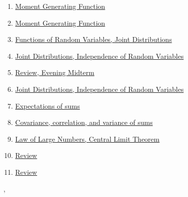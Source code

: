 \documentclass[11pt]{article}
\renewcommand{\today}{\shortmonthname[\the\month] \the \day,  \the\year}
\begin{document}
\begin{enumerate}
	\item \href{https://mp.weixin.qq.com/s/lP6WmQxTuOAwIVWX2l-R7w}{Moment Generating Function}	%
	\item \href{https://mp.weixin.qq.com/s/w0xw15BrqY0AKYgW2ufKmw}{Moment Generating Function}	%
	\item \href{https://mp.weixin.qq.com/s/Du8kpT0ZJNqTmF19jB77Tw}{Functions of Random Variables, Joint Distributions}	%
	\item \href{https://mp.weixin.qq.com/s/xD0om1IdLj2fYWv1Va8x_g}{Joint Distributions, Independence of Random Variables}	%
	\item \href{https://mp.weixin.qq.com/s/WeCfY_6vsuOCYoa5fzg6pA}{Review, Evening Midterm}	%
	\item \href{https://mp.weixin.qq.com/s/puiGaF7O1M4J7Uo1hb97Nw}{Joint Distributions, Independence of Random Variables}	%
	\item \href{https://mp.weixin.qq.com/s/fEFx-A-fnqv8xho8BOdB5w}{Expectations of sums}	%
	\item \href{https://mp.weixin.qq.com/s/ikPEHT3tXY-da3wx5OJwFA}{Covariance, correlation, and variance of sums}	%
	\item \href{https://mp.weixin.qq.com/s/YKNfrUm2wMZBPx_1pOuOUQ}{Law of Large Numbers, Central Limit Theorem}	%
	\item \href{https://mp.weixin.qq.com/s/aHcqkczkwNbvHpGR82rQJA}{Review}	%
	\item \href{https://mp.weixin.qq.com/s/1GWPJNgaj-SzId50GX7h8Q}{Review}	%
\end{enumerate}

%
\begin{flushright}
	\tiny \today 
\end{flushright}
\end{document}
